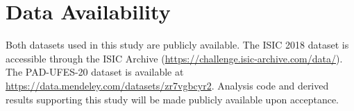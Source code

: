 \section*{Data Availability}

Both datasets used in this study are publicly available. The ISIC 2018 dataset is accessible through the ISIC Archive (\url{https://challenge.isic-archive.com/data/}). The PAD-UFES-20 dataset is available at \url{https://data.mendeley.com/datasets/zr7vgbcyr2}. Analysis code and derived results supporting this study will be made publicly available upon acceptance.
